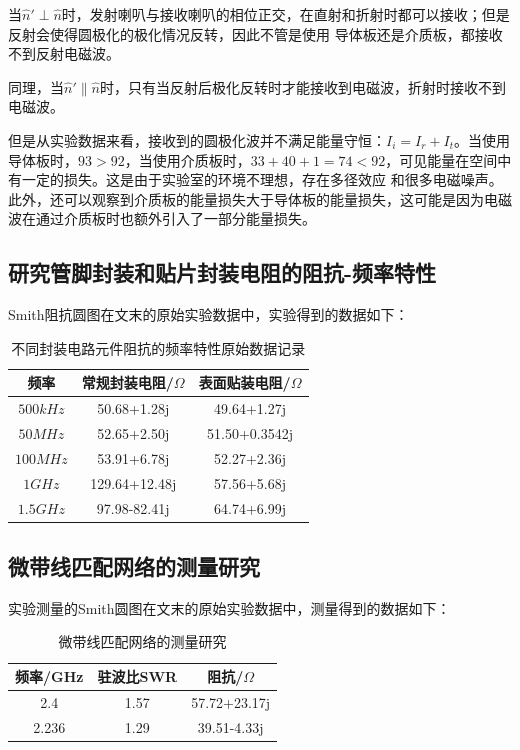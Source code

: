 \documentclass[UTF8]{ctexart}
\begin{document}
当$\hat{n}'\perp\hat{n}$时，发射喇叭与接收喇叭的相位正交，在直射和折射时都可以接收；但是反射会使得圆极化的极化情况反转，因此不管是使用
导体板还是介质板，都接收不到反射电磁波。

同理，当$\hat{n}'\parallel\hat{n}$时，只有当反射后极化反转时才能接收到电磁波，折射时接收不到电磁波。

但是从实验数据来看，接收到的圆极化波并不满足能量守恒：$I_i=I_r+I_t$。当使用导体板时，$93>92$，当使用介质板时，$33+40+1=74<92$，可见能量在空间中有一定的损失。这是由于实验室的环境不理想，存在多径效应
和很多电磁噪声。此外，还可以观察到介质板的能量损失大于导体板的能量损失，这可能是因为电磁波在通过介质板时也额外引入了一部分能量损失。


\subsection{研究管脚封装和贴片封装电阻的阻抗-频率特性}
Smith阻抗圆图在文末的原始实验数据中，实验得到的数据如下：
\begin{table}[H]
    \centering
    \renewcommand{\arraystretch}{1.5}
    \caption{不同封装电路元件阻抗的频率特性原始数据记录}
    \begin{tabular}{|c|c|c|}\hline
        频率&常规封装电阻/$\Omega$&表面贴装电阻/$\Omega$\\\hline
        $500kHz$&50.68+1.28j&49.64+1.27j\\\hline
        $50MHz$&52.65+2.50j&51.50+0.3542j\\\hline
        $100MHz$&53.91+6.78j&52.27+2.36j\\\hline
        $1GHz$&129.64+12.48j&57.56+5.68j\\\hline
        $1.5GHz$&97.98-82.41j&64.74+6.99j\\\hline
    \end{tabular}
\end{table}


\subsection{微带线匹配网络的测量研究}
实验测量的Smith圆图在文末的原始实验数据中，测量得到的数据如下：
\begin{table}[H]
    \centering
    \renewcommand{\arraystretch}{1.5}

    \caption{微带线匹配网络的测量研究}
    \begin{tabular}{|c|c|c|}\hline
        频率/GHz&驻波比SWR&阻抗/$\Omega$\\\hline
        2.4&1.57&57.72+23.17j\\\hline
        2.236&1.29&39.51-4.33j\\\hline
    \end{tabular}
\end{table}
\end{document}
